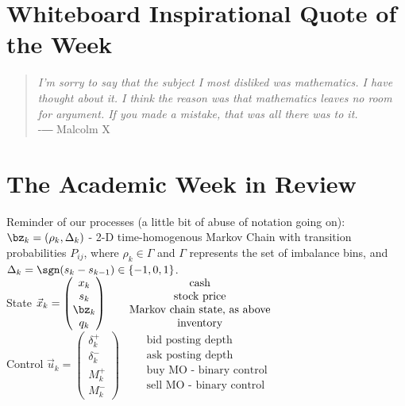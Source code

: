 \documentclass[12pt]{article}
\begin{document}
\newpage
\section*{Whiteboard Inspirational Quote of the Week}
\begin{quote}
\textit{I'm sorry to say that the subject I most disliked was mathematics. I have thought about it. I think the reason was that mathematics leaves no room for argument. If you made a mistake, that was all there was to it.} \\-― Malcolm X 
\end{quote} 



\section*{The Academic Week in Review}
Reminder of our processes (a little bit of abuse of notation going on):\\
$\bz_k = (\rho_k, \Delta_k)$ - 2-D time-homogenous Markov Chain with transition probabilities $P_{ij}$, where $\rho_k \in \Gamma$ and $\Gamma$ represents the set of imbalance bins, and $\Delta_k = \sgn(s_k - s_{k-1}) \in \{-1,0,1\}$. \\
State $\vec{x}_{k} = \begin{pmatrix}
x_k \\
s_k \\
\bz_k \\
q_k 
\end{pmatrix} \qquad \begin{matrix}
\text{cash} \\
\text{stock price} \\
\text{Markov chain state, as above} \\
\text{inventory} \\
\end{matrix}$ \\
Control $\vec{u}_{k} = \begin{pmatrix}
\delta_k^+ \\
\delta_k^- \\
M_k^+ \\
M_k^-
\end{pmatrix} \qquad \begin{matrix}
\text{bid posting depth} \\
\text{ask posting depth} \\
\text{buy MO - binary control} \\
\text{sell MO - binary control} \\
\end{matrix}$ \\
\end{document}
